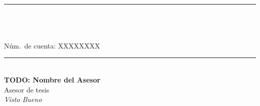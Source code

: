 \begin{minipage}[t]{0.45\textwidth}
  \rule{\textwidth}{0.6pt}\\[0.2cm]
  \textbf{\FirmanteName}\\
  {\small \FirmanteCargo}\\
  {\small Núm.\ de cuenta: XXXXXXXX} %
\end{minipage}%
\hfill
\begin{minipage}[t]{0.45\textwidth}
  \rule{\textwidth}{0.6pt}\\[0.2cm]
  \textbf{TODO: Nombre del Asesor}\\  %
  {\small Asesor de tesis}\\
  {\small \textit{Visto Bueno}}
\end{minipage}
